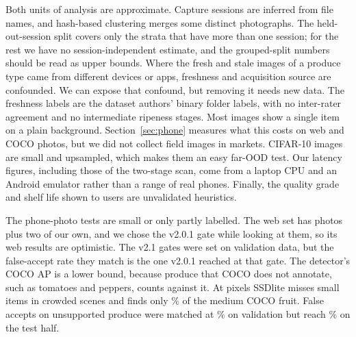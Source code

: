 Both units of analysis are approximate. Capture sessions are inferred from
file names, and hash-based clustering merges some distinct photographs. The
held-out-session split covers only the \NHeldOutStrata{} strata that have more
than one session; for the rest we have no session-independent estimate, and the
grouped-split numbers should be read as upper bounds. Where the fresh and stale
images of a produce type came from different devices or apps, freshness and
acquisition source are confounded. We can expose that confound, but removing it
needs new data. The freshness labels are the dataset authors' binary folder
labels, with no inter-rater agreement and no intermediate ripeness stages. Most
images show a single item on a plain background. Section~\ref{sec:phone}
measures what this costs on web and COCO photos, but we did not collect field
images in markets. CIFAR-10 images are small and upsampled, which makes them an
easy far-OOD test. Our latency figures, including those of the two-stage scan,
come from a laptop CPU and an Android emulator rather than a range of real
phones. Finally, the quality grade and shelf life shown to users are
unvalidated heuristics.

The phone-photo tests are small or only partly labelled. The web set has
\WebN{} photos plus two of our own, and we chose the v2.0.1 gate while looking
at them, so its web results are optimistic. The v2.1 gates were set on
validation data, but the false-accept rate they match is the one v2.0.1 reached
at that gate. The detector's COCO AP is a lower bound, because produce that
COCO does not annotate, such as tomatoes and peppers, counts against it. At
\DetInput{} pixels SSDlite misses small items in crowded scenes and finds only
\ScanMedFound\% of the medium COCO fruit. False accepts on unsupported produce
were matched at \CalWhole\% on validation but reach \ScanOodDet\% on the test
half.
